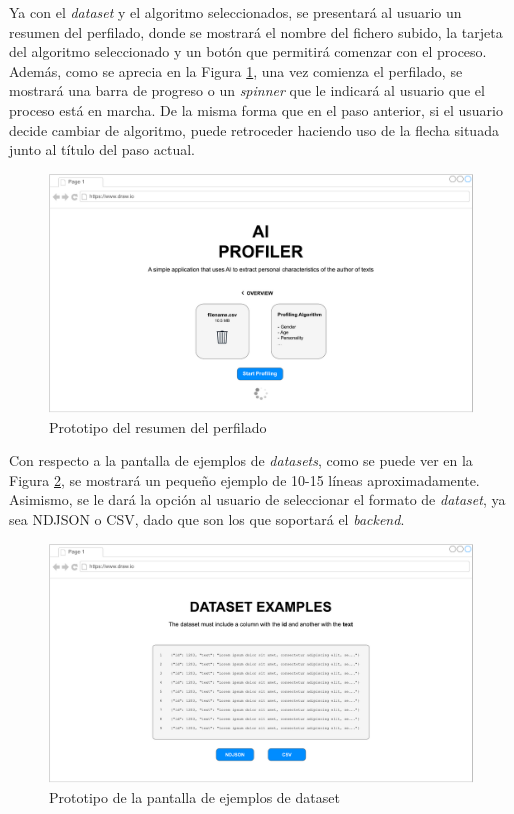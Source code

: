 \bigskip
Ya con el \textit{dataset} y el algoritmo seleccionados, se presentará al usuario un resumen del perfilado, donde se mostrará
el nombre del fichero subido, la tarjeta del algoritmo seleccionado y un botón que permitirá comenzar con el proceso.
Además, como se aprecia en la Figura \ref{fig:prototipo_resumen_perfilado}, una vez comienza el perfilado, se mostrará una barra de progreso
o un \textit{spinner} que le indicará al usuario que el proceso está en marcha. De la misma forma que en el paso anterior, si el usuario
decide cambiar de algoritmo, puede retroceder haciendo uso de la flecha situada junto al título del paso actual.

\bigskip
\begin{figure}[H]
	\centering
	\includegraphics[width=\textwidth]{diagramas/landing-overview.pdf}
	\caption{Prototipo del resumen del perfilado}
	\label{fig:prototipo_resumen_perfilado}
\end{figure}

\bigskip
Con respecto a la pantalla de ejemplos de \textit{datasets}, como se puede ver en la Figura \ref{fig:prototipo_ejemplos_dataset},
se mostrará un pequeño ejemplo de 10-15 líneas aproximadamente. Asimismo, se le dará la opción al usuario de seleccionar el 
formato de \textit{dataset}, ya sea NDJSON o CSV, dado que son los que soportará el \textit{backend}.

\bigskip
\begin{figure}[H]
	\centering
	\includegraphics[width=\textwidth]{diagramas/dataset-examples.pdf}
	\caption{Prototipo de la pantalla de ejemplos de dataset}
	\label{fig:prototipo_ejemplos_dataset}
\end{figure}

